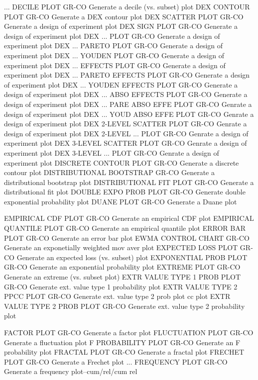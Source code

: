 ... DECILE PLOT             GR-CO Generate a decile (vs. subset) plot
DEX CONTOUR PLOT            GR-CO Generate a DEX contour plot
DEX SCATTER PLOT            GR-CO Generate a design of experiment plot
DEX SIGN PLOT               GR-CO Generate a design of experiment plot
DEX ... PLOT                GR-CO Generate a design of experiment plot
DEX ... PARETO PLOT         GR-CO Generate a design of experiment plot
DEX ... YOUDEN PLOT         GR-CO Generate a design of experiment plot
DEX ... EFFECTS PLOT        GR-CO Generate a design of experiment plot
DEX ... PARETO EFFECTS PLOT GR-CO Generate a design of experiment plot
DEX ... YOUDEN EFFECTS PLOT GR-CO Generate a design of experiment plot
DEX ... ABSO EFFECTS PLOT   GR-CO Generate a design of experiment plot
DEX ... PARE ABSO EFFE PLOT GR-CO Genrate a design of experiment plot
DEX ... YOUD ABSO EFFE PLOT GR-CO Genrate a design of experiment plot
DEX 2-LEVEL SCATTER PLOT    GR-CO Genrate a design of experiment plot
DEX 2-LEVEL ... PLOT        GR-CO Genrate a design of experiment plot
DEX 3-LEVEL SCATTER PLOT    GR-CO Genrate a design of experiment plot
DEX 3-LEVEL ... PLOT        GR-CO Genrate a design of experiment plot
DISCRETE CONTOUR PLOT       GR-CO Generate a discrete contour plot
DISTRIBUTIONAL BOOTSTRAP    GR-CO Generate a distributional bootstrap plot
DISTRIBUTIONAL FIT PLOT     GR-CO Generate a distributional fit plot
DOUBLE EXPO PROB PLOT       GR-CO Generate double exponential probability plot
DUANE PLOT                  GR-CO Generate a Duane plot

EMPIRICAL CDF PLOT          GR-CO Generate an empirical CDF plot
EMPIRICAL QUANTILE PLOT     GR-CO Generate an empirical quantile plot
ERROR BAR PLOT              GR-CO Generate an error bar plot
EWMA CONTROL CHART          GR-CO Generate an exponetially weighted mov aver plot
EXPECTED LOSS PLOT          GR-CO Generate an expected loss (vs. subset) plot
EXPONENTIAL PROB PLOT       GR-CO Generate an exponential probability plot
EXTREME PLOT                GR-CO Generate an extreme (vs. subset plot)
EXTR VALUE TYPE 1 PROB PLOT GR-CO Generate ext. value type 1 probability plot
EXTR VALUE TYPE 2 PPCC PLOT GR-CO Generate ext. value type 2 prob plot cc plot
EXTR VALUE TYPE 2 PROB PLOT GR-CO Generate ext. value type 2 probability plot

FACTOR PLOT                 GR-CO Generate  a factor plot
FLUCTUATION PLOT            GR-CO Generate  a fluctuation plot
F PROBABILITY PLOT          GR-CO Generate an F probability plot
FRACTAL PLOT                GR-CO Generate a fractal plot
FRECHET PLOT                GR-CO Generate a Frechet plot
... FREQUENCY PLOT          GR-CO Generate a frequency plot--cum/rel/cum rel


